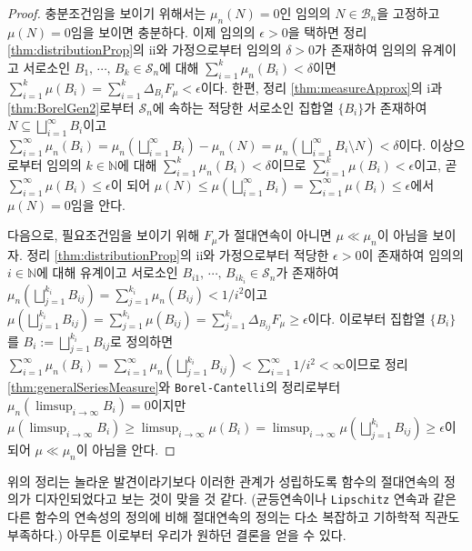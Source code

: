 \begin{proof}
    충분조건임을 보이기 위해서는 $\mu_n(N)=0$인 임의의 $N\in\mathcal{B}_n$을 고정하고 $\mu(N)=0$임을 보이면 충분하다. 이제 임의의 $\epsilon>0$을 택하면 정리 \ref{thm:distributionProp}의 ii와 가정으로부터 임의의 $\delta>0$가 존재하여 임의의 유계이고 서로소인 $B_1,\,\cdots,\,B_k\in\mathcal{S}_n$에 대해 $\sum_{i=1}^k\mu_n(B_i)<\delta$이면 $\sum_{i=1}^k\mu(B_i)=\sum_{i=1}^k\Delta_{B_i}F_\mu<\epsilon$이다. 한편, 정리 \ref{thm:measureApprox}의 i과 \ref{thm:BorelGen2}로부터 $\mathcal{S}_n$에 속하는 적당한 서로소인 집합열 $\{B_i\}$가 존재하여 $N\subseteq\bigsqcup_{i=1}^\infty B_i$이고 $\sum_{i=1}^\infty\mu_n(B_i)=\mu_n(\bigsqcup_{i=1}^\infty B_i)-\mu_n(N)=\mu_n(\bigsqcup_{i=1}^\infty B_i\setminus N)<\delta$이다. 이상으로부터 임의의 $k\in\mathbb{N}$에 대해 $\sum_{i=1}^k\mu_n(B_i)<\delta$이므로 $\sum_{i=1}^k\mu(B_i)<\epsilon$이고, 곧 $\sum_{i=1}^\infty\mu(B_i)\leq\epsilon$이 되어 $\mu(N)\leq\mu(\bigsqcup_{i=1}^\infty B_i)=\sum_{i=1}^\infty\mu(B_i)\leq\epsilon$에서 $\mu(N)=0$임을 안다.

    다음으로, 필요조건임을 보이기 위해 $F_\mu$가 절대연속이 아니면 $\mu\ll\mu_n$이 아님을 보이자. 정리 \ref{thm:distributionProp}의 ii와 가정으로부터 적당한 $\epsilon>0$이 존재하여 임의의 $i\in\mathbb{N}$에 대해 유계이고 서로소인 $B_{i1},\,\cdots,\,B_{ik_i}\in\mathcal{S}_n$가 존재하여 $\mu_n(\bigsqcup_{j=1}^{k_i}B_{ij})=\sum_{j=1}^{k_i}\mu_n(B_{ij})<1/i^2$이고 $\mu(\bigsqcup_{j=1}^{k_i}B_{ij})=\sum_{j=1}^{k_i}\mu(B_{ij})=\sum_{j=1}^{k_i}\Delta_{B_{ij}}F_\mu\geq\epsilon$이다. 이로부터 집합열 $\{B_i\}$를 $B_i:=\bigsqcup_{j=1}^{k_i}B_{ij}$로 정의하면 $\sum_{i=1}^\infty\mu_n(B_i)=\sum_{i=1}^\infty\mu_n(\bigsqcup_{j=1}^{k_i}B_{ij})<\sum_{i=1}^\infty1/i^2<\infty$이므로 정리 \ref{thm:generalSeriesMeasure}와 \texttt{Borel-Cantelli}의 정리로부터 $\mu_n(\limsup_{i\to\infty}B_i)=0$이지만 $\mu(\limsup_{i\to\infty}B_i)\geq\limsup_{i\to\infty}\mu(B_i)=\limsup_{i\to\infty}\mu(\bigsqcup_{j=1}^{k_i}B_{ij})\geq\epsilon$이 되어 $\mu\ll\mu_n$이 아님을 안다.
\end{proof}

위의 정리는 놀라운 발견이라기보다 이러한 관계가 성립하도록 함수의 절대연속의 정의가 디자인되었다고 보는 것이 맞을 것 같다. (균등연속이나 \texttt{Lipschitz} 연속과 같은 다른 함수의 연속성의 정의에 비해 절대연속의 정의는 다소 복잡하고 기하학적 직관도 부족하다.) 아무튼 이로부터 우리가 원하던 결론을 얻을 수 있다.


